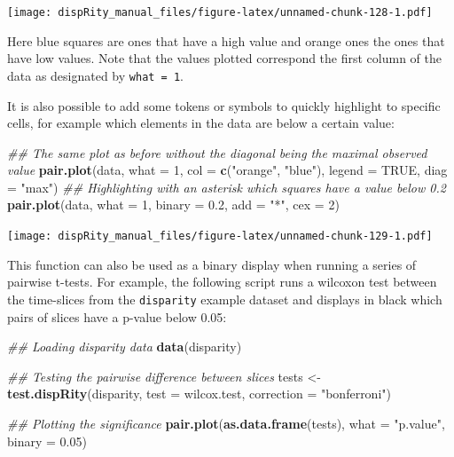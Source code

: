 \documentclass[]{book}
\newenvironment{Shaded}{\begin{snugshade}}{\end{snugshade}}
\newcommand{\CommentTok}[1]{\textcolor[rgb]{0.56,0.35,0.01}{\textit{#1}}}
\newcommand{\DataTypeTok}[1]{\textcolor[rgb]{0.13,0.29,0.53}{#1}}
\newcommand{\DecValTok}[1]{\textcolor[rgb]{0.00,0.00,0.81}{#1}}
\newcommand{\FloatTok}[1]{\textcolor[rgb]{0.00,0.00,0.81}{#1}}
\newcommand{\KeywordTok}[1]{\textcolor[rgb]{0.13,0.29,0.53}{\textbf{#1}}}
\newcommand{\NormalTok}[1]{#1}
\newcommand{\OtherTok}[1]{\textcolor[rgb]{0.56,0.35,0.01}{#1}}
\newcommand{\StringTok}[1]{\textcolor[rgb]{0.31,0.60,0.02}{#1}}
\begin{document}
\texttt{[image: dispRity\_manual\_files/figure-latex/unnamed-chunk-128-1.pdf]}

Here blue squares are ones that have a high value and orange ones the ones that have low values.
Note that the values plotted correspond the first column of the data as designated by \texttt{what\ =\ 1}.

It is also possible to add some tokens or symbols to quickly highlight to specific cells, for example which elements in the data are below a certain value:

\begin{Shaded}
\begin{Highlighting}[]
\CommentTok{## The same plot as before without the diagonal being the maximal observed value}
\KeywordTok{pair.plot}\NormalTok{(data, }\DataTypeTok{what =} \DecValTok{1}\NormalTok{, }\DataTypeTok{col =} \KeywordTok{c}\NormalTok{(}\StringTok{"orange"}\NormalTok{, }\StringTok{"blue"}\NormalTok{), }\DataTypeTok{legend =} \OtherTok{TRUE}\NormalTok{, }\DataTypeTok{diag =} \StringTok{"max"}\NormalTok{)}
\CommentTok{## Highlighting with an asterisk which squares have a value below 0.2}
\KeywordTok{pair.plot}\NormalTok{(data, }\DataTypeTok{what =} \DecValTok{1}\NormalTok{, }\DataTypeTok{binary =} \FloatTok{0.2}\NormalTok{, }\DataTypeTok{add =} \StringTok{"*"}\NormalTok{, }\DataTypeTok{cex =} \DecValTok{2}\NormalTok{)}
\end{Highlighting}
\end{Shaded}

\texttt{[image: dispRity\_manual\_files/figure-latex/unnamed-chunk-129-1.pdf]}

This function can also be used as a binary display when running a series of pairwise t-tests.
For example, the following script runs a wilcoxon test between the time-slices from the \texttt{disparity} example dataset and displays in black which pairs of slices have a p-value below 0.05:

\begin{Shaded}
\begin{Highlighting}[]
\CommentTok{## Loading disparity data}
\KeywordTok{data}\NormalTok{(disparity)}

\CommentTok{## Testing the pairwise difference between slices}
\NormalTok{tests <-}\StringTok{ }\KeywordTok{test.dispRity}\NormalTok{(disparity, }\DataTypeTok{test =}\NormalTok{ wilcox.test, }\DataTypeTok{correction =} \StringTok{"bonferroni"}\NormalTok{)}

\CommentTok{## Plotting the significance}
\KeywordTok{pair.plot}\NormalTok{(}\KeywordTok{as.data.frame}\NormalTok{(tests), }\DataTypeTok{what =} \StringTok{"p.value"}\NormalTok{, }\DataTypeTok{binary =} \FloatTok{0.05}\NormalTok{)}
\end{Highlighting}
\end{Shaded}
\end{document}
